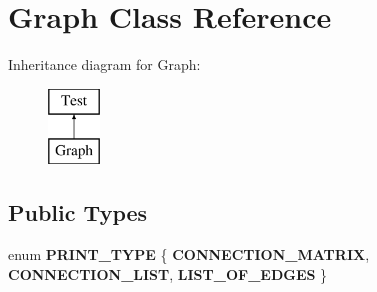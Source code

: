\hypertarget{class_graph}{}\section{Graph Class Reference}
\label{class_graph}
Inheritance diagram for Graph\+:\begin{figure}[H]
\begin{center}
\leavevmode
\includegraphics[height=2.000000cm]{class_graph}
\end{center}
\end{figure}
\subsection*{Public Types}
\begin{DoxyCompactItemize}
\item 
\mbox{\label{class_graph_aabbabd0059aba1f53232d846cd7ca39e}} 
enum {\bfseries P\+R\+I\+N\+T\+\_\+\+T\+Y\+PE} \{ {\bfseries C\+O\+N\+N\+E\+C\+T\+I\+O\+N\+\_\+\+M\+A\+T\+R\+IX}, 
{\bfseries C\+O\+N\+N\+E\+C\+T\+I\+O\+N\+\_\+\+L\+I\+ST}, 
{\bfseries L\+I\+S\+T\+\_\+\+O\+F\+\_\+\+E\+D\+G\+ES}
 \}
\end{DoxyCompactItemize}
